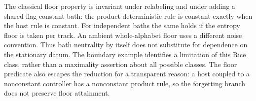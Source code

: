The classical floor property is invariant under relabeling and under adding a shared-flag constant bath: the product deterministic rule is constant exactly when the host rule is constant. For independent baths the same holds if the entropy floor is taken per track. An ambient whole-alphabet floor uses a different noise convention. Thus bath neutrality by itself does not substitute for dependence on the stationary datum. The boundary example identifies a limitation of this Rice class, rather than a maximality assertion about all possible classes. The floor predicate also escapes the reduction for a transparent reason: a host coupled to a nonconstant controller has a nonconstant product rule, so the forgetting branch does not preserve floor attainment.
